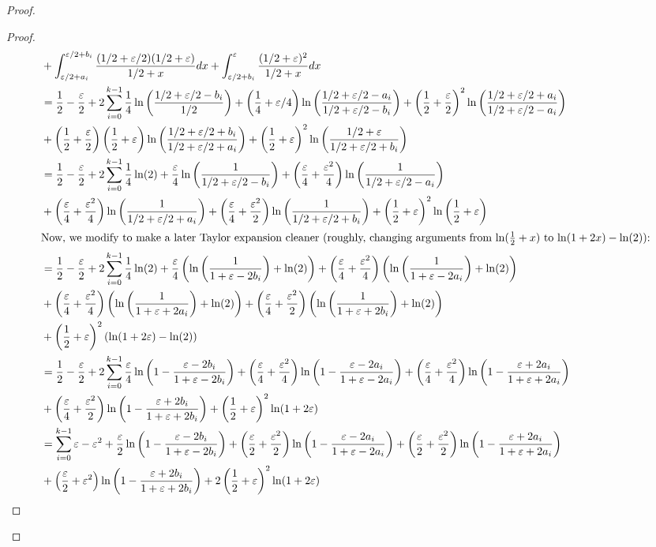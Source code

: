 \begin{proof}
\begin{proof}
\begin{align*}
    &+\int_{\varepsilon/2+a_i}^{\varepsilon/2+b_i} \frac{(1/2+\varepsilon/2)(1/2+\varepsilon)}{1/2+x} dx + \int_{\varepsilon/2+b_i}^{\varepsilon} \frac{(1/2+\varepsilon)^2}{1/2+x} dx\\
    & = \frac{1}{2} - \frac{\varepsilon}{2} + 2 \sum_{i=0}^{k-1} \frac{1}{4} \ln\left(\frac{1/2 + \varepsilon/2 - b_i}{1/2}\right) + \left(\frac{1}{4}+\varepsilon/4\right) \ln\left(\frac{1/2 + \varepsilon/2-a_i}{1/2 + \varepsilon/2-b_i}\right) + \left(\frac{1}{2} + \frac{\varepsilon}{2}\right)^2 \ln\left(\frac{1/2 + \varepsilon/2 + a_i}{1/2 + \varepsilon/2 - a_i}\right) \\
    & + \left(\frac{1}{2} + \frac{\varepsilon}{2}\right)\left(\frac{1}{2}+\varepsilon\right)\ln\left(\frac{1/2 + \varepsilon/2 + b_i}{1/2 + \varepsilon/2 + a_i}\right) + \left(\frac{1}{2}+\varepsilon\right)^2 \ln\left(\frac{1/2 + \varepsilon}{1/2 + \varepsilon/2 + b_i}\right)\\
    & = \frac{1}{2} - \frac{\varepsilon}{2} + 2 \sum_{i=0}^{k-1} \frac{1}{4} \ln(2) + \frac{\varepsilon}{4} \ln\left(\frac{1}{1/2 + \varepsilon/2 - b_i}\right) + \left(\frac{\varepsilon}{4}+\frac{\varepsilon^2}{4}\right)\ln\left(\frac{1}{1/2 + \varepsilon/2 - a_i}\right) \\
    & + \left(\frac{\varepsilon}{4} + \frac{\varepsilon^2}{4}\right)\ln\left(\frac{1}{1/2 + \varepsilon/2 + a_i}\right) + \left(\frac{\varepsilon}{4}+\frac{\varepsilon^2}{2}\right)\ln\left(\frac{1}{1/2 + \varepsilon/2 + b_i}\right) + \left(\frac{1}{2}+\varepsilon\right)^2 \ln\left(\frac{1}{2}+\varepsilon\right)\\
    \intertext{Now, we modify to make a later Taylor expansion cleaner (roughly, changing arguments from $\ln(\frac{1}{2}+x)$ to $\ln(1+2x)-\ln(2)$):}
    & = \frac{1}{2} - \frac{\varepsilon}{2} + 2 \sum_{i=0}^{k-1} \frac{1}{4} \ln(2) + \frac{\varepsilon}{4} \left(\ln\left(\frac{1}{1 + \varepsilon - 2b_i}\right)+\ln(2)\right) + \left(\frac{\varepsilon}{4} + \frac{\varepsilon^2}{4}\right) \left(\ln\left(\frac{1}{1+\varepsilon-2a_i}\right) + \ln(2)\right) \\
    &+ \left(\frac{\varepsilon}{4}+\frac{\varepsilon^2}{4}\right)\left(\ln\left(\frac{1}{1+\varepsilon+2a_i}\right)+\ln(2)\right) + \left(\frac{\varepsilon}{4}+\frac{\varepsilon^2}{2}\right)\left(\ln\left(\frac{1}{1 + \varepsilon + 2b_i}\right)+\ln(2)\right) \\
    & + \left(\frac{1}{2}+\varepsilon\right)^2 \left(\ln(1+2\varepsilon)-\ln(2)\right)\\
    & = \frac{1}{2} - \frac{\varepsilon}{2} + 2 \sum_{i=0}^{k-1} \frac{\varepsilon}{4} \ln\left(1-\frac{\varepsilon-2b_i}{1+\varepsilon-2b_i}\right) + \left(\frac{\varepsilon}{4}+\frac{\varepsilon^2}{4}\right)\ln\left(1-\frac{\varepsilon-2a_i}{1+\varepsilon-2a_i}\right) + \left(\frac{\varepsilon}{4}+\frac{\varepsilon^2}{4}\right)\ln\left(1-\frac{\varepsilon+2a_i}{1+\varepsilon+2a_i}\right) \\
    & + \left(\frac{\varepsilon}{4}+\frac{\varepsilon^2}{2}\right) \ln\left(1 - \frac{\varepsilon+2b_i}{1+\varepsilon+2b_i}\right) + \left(\frac{1}{2}+\varepsilon\right)^2 \ln(1+2 \varepsilon)\\
    & = \sum_{i=0}^{k-1} \varepsilon - \varepsilon^2 +\frac{\varepsilon}{2} \ln\left(1-\frac{\varepsilon-2b_i}{1+\varepsilon-2b_i}\right) + \left(\frac{\varepsilon}{2}+\frac{\varepsilon^2}{2}\right)\ln\left(1-\frac{\varepsilon-2a_i}{1+\varepsilon-2a_i}\right) + \left(\frac{\varepsilon}{2}+\frac{\varepsilon^2}{2}\right)\ln\left(1-\frac{\varepsilon+2a_i}{1+\varepsilon+2a_i}\right) \\
    & + \left(\frac{\varepsilon}{2}+\varepsilon^2\right) \ln\left(1 - \frac{\varepsilon+2b_i}{1+\varepsilon+2b_i}\right) + 2\left(\frac{1}{2}+\varepsilon\right)^2 \ln(1+2 \varepsilon) 
\end{align*}


\end{proof}
\end{proof}
